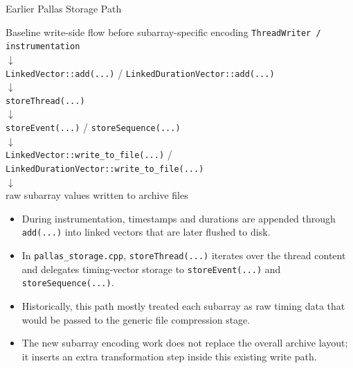 \documentclass[10pt,aspectratio=169]{beamer}
\begin{document}
\begin{frame}{Earlier Pallas Storage Path}
  \small
  \begin{block}{Baseline write-side flow before subarray-specific encoding}
    \centering
    \texttt{ThreadWriter / instrumentation} \\
    $\downarrow$ \\
    \texttt{LinkedVector::add(...)} / \texttt{LinkedDurationVector::add(...)} \\
    $\downarrow$ \\
    \texttt{storeThread(...)} \\
    $\downarrow$ \\
    \texttt{storeEvent(...)} / \texttt{storeSequence(...)} \\
    $\downarrow$ \\
    \texttt{LinkedVector::write\_to\_file(...)} / \texttt{LinkedDurationVector::write\_to\_file(...)} \\
    $\downarrow$ \\
    raw subarray values written to archive files
  \end{block}

  \begin{itemize}
    \item<2-> During instrumentation, timestamps and durations are appended through \texttt{add(...)} into linked vectors that are later flushed to disk.
    \item<3-> In \texttt{pallas\_storage.cpp}, \texttt{storeThread(...)} iterates over the thread content and delegates timing-vector storage to \texttt{storeEvent(...)} and \texttt{storeSequence(...)}.
    \item<4-> Historically, this path mostly treated each subarray as raw timing data that would be passed to the generic file compression stage.
    \item<5-> The new subarray encoding work does not replace the overall archive layout; it inserts an extra transformation step inside this existing write path.
  \end{itemize}
\end{frame}
\end{document}
